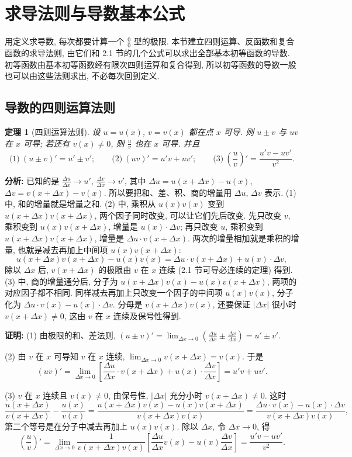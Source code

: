 \documentclass[UTF8,openany]{ctexbook}
\theoremstyle{chinesetextbook}
\newtheorem{theorem}{定理}[section]
\newenvironment{cnproof}{\par\indent\textbf{证明:} \ignorespaces}{\par}
\begin{document}
\section{求导法则与导数基本公式}
用定义求导数, 每次都要计算一个 $\displaystyle\frac00$ 型的极限. 本节建立四则运算、反函数和复合函数的求导法则, 由它们和 2.1 节的几个公式可以求出全部基本初等函数的导数. 初等函数由基本初等函数经有限次四则运算和复合得到, 所以初等函数的导数一般也可以由这些法则求出, 不必每次回到定义.
\subsection{导数的四则运算法则}
\begin{theorem}[四则运算法则]\label{thm:c2-2-arith}
设 $u=u(x)$, $v=v(x)$ 都在点 $x$ 可导. 则 $u\pm v$ 与 $uv$ 在 $x$ 可导; 若还有 $v(x)\ne0$, 则 $\displaystyle\frac uv$ 也在 $x$ 可导. 并且
\[
\text{(1)}\ (u\pm v)'=u'\pm v';\qquad\text{(2)}\ (uv)'=u'v+uv';\qquad\text{(3)}\ \left(\frac uv\right)'=\frac{u'v-uv'}{v^2}.
\]
\end{theorem}
\par\indent\textbf{分析:} 已知的是 $\displaystyle\frac{\Delta u}{\Delta x}\to u'$, $\displaystyle\frac{\Delta v}{\Delta x}\to v'$, 其中 $\Delta u=u(x+\Delta x)-u(x)$, $\Delta v=v(x+\Delta x)-v(x)$. 所以要把和、差、积、商的增量用 $\Delta u$, $\Delta v$ 表示. (1) 中, 和的增量就是增量之和. (2) 中, 乘积从 $u(x)v(x)$ 变到 $u(x+\Delta x)v(x+\Delta x)$, 两个因子同时改变, 可以让它们先后改变. 先只改变 $v$, 乘积变到 $u(x)v(x+\Delta x)$, 增量是 $u(x)\cdot\Delta v$; 再只改变 $u$, 乘积变到 $u(x+\Delta x)v(x+\Delta x)$, 增量是 $\Delta u\cdot v(x+\Delta x)$. 两次的增量相加就是乘积的增量, 也就是减去再加上中间项 $u(x)v(x+\Delta x)$:
\[
u(x+\Delta x)v(x+\Delta x)-u(x)v(x)=\Delta u\cdot v(x+\Delta x)+u(x)\cdot\Delta v,
\]
除以 $\Delta x$ 后, $v(x+\Delta x)$ 的极限由 $v$ 在 $x$ 连续 (2.1 节可导必连续的定理) 得到. (3) 中, 商的增量通分后, 分子为 $u(x+\Delta x)v(x)-u(x)v(x+\Delta x)$, 两项的对应因子都不相同. 同样减去再加上只改变一个因子的中间项 $u(x)v(x)$, 分子化为 $\Delta u\cdot v(x)-u(x)\cdot\Delta v$. 分母是 $v(x+\Delta x)v(x)$, 还要保证 $|\Delta x|$ 很小时 $v(x+\Delta x)\ne0$, 这由 $v$ 在 $x$ 连续及保号性得到.
\begin{cnproof}
(1) 由极限的和、差法则, $\displaystyle(u\pm v)'=\lim_{\Delta x\to0}\left(\frac{\Delta u}{\Delta x}\pm\frac{\Delta v}{\Delta x}\right)=u'\pm v'$.

(2) 由 $v$ 在 $x$ 可导知 $v$ 在 $x$ 连续, $\displaystyle\lim_{\Delta x\to0}v(x+\Delta x)=v(x)$. 于是
\[
(uv)'=\lim_{\Delta x\to0}\left[\frac{\Delta u}{\Delta x}\cdot v(x+\Delta x)+u(x)\cdot\frac{\Delta v}{\Delta x}\right]=u'v+uv'.
\]

(3) $v$ 在 $x$ 连续且 $v(x)\ne0$, 由保号性, $|\Delta x|$ 充分小时 $v(x+\Delta x)\ne0$. 这时
\[
\frac{u(x+\Delta x)}{v(x+\Delta x)}-\frac{u(x)}{v(x)}=\frac{u(x+\Delta x)v(x)-u(x)v(x+\Delta x)}{v(x+\Delta x)v(x)}=\frac{\Delta u\cdot v(x)-u(x)\cdot\Delta v}{v(x+\Delta x)v(x)},
\]
第二个等号是在分子中减去再加上 $u(x)v(x)$. 除以 $\Delta x$, 令 $\Delta x\to0$, 得
\[
\left(\frac uv\right)'=\lim_{\Delta x\to0}\frac1{v(x+\Delta x)v(x)}\left[\frac{\Delta u}{\Delta x}v(x)-u(x)\frac{\Delta v}{\Delta x}\right]=\frac{u'v-uv'}{v^2}.
\]
\end{cnproof}
\end{document}
